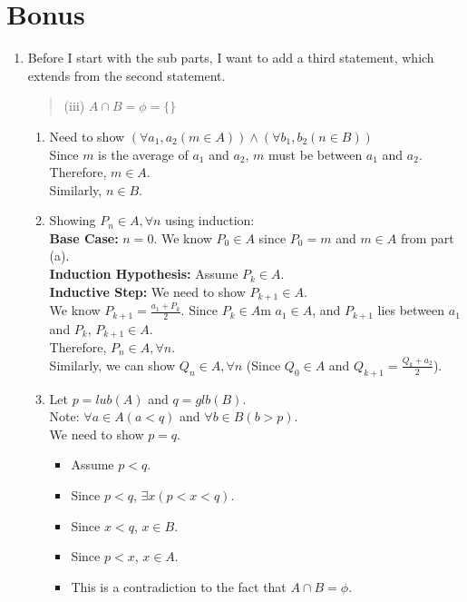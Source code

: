 \documentclass[a4paper]{article}
\begin{document}
\section{Bonus}
    \begin{enumerate}
        \item Before I start with the sub parts, I want to add a third statement, which extends from the second statement.
        \begin{quote}
            (iii) $A \cap B = \phi = \{\}$
        \end{quote}

        \begin{enumerate}
            \item Need to show $(\forall a_1, a_2 (m \in A)) \land (\forall b_1, b_2 (n \in B))$ \\
            Since $m$ is the average of $a_1$ and $a_2$, $m$ must be between $a_1$ and $a_2$. Therefore, $m \in A$. \\
            Similarly, $n \in B$. \\

            \item Showing $P_n \in A, \forall n$ using induction: \\
            \textbf{Base Case:} $n = 0$. We know $P_0 \in A$ since $P_0 = m$ and $m \in A$ from part (a). \\
            \textbf{Induction Hypothesis:} Assume $P_k \in A$. \\
            \textbf{Inductive Step:} We need to show $P_{k+1} \in A$. \\

            We know $P_{k+1} = \frac{a_1 + P_k}{2}$. Since $P_k \in A$m $a_1 \in A$, and $P_{k+1}$ lies between $a_1$ and $P_k$, $P_{k+1} \in A$. \\
            Therefore, $P_n \in A, \forall n$. \\

            Similarly, we can show $Q_n \in A, \forall n$ (Since $Q_0 \in A$ and $Q_{k+1} = \frac{Q_k + a_2}{2}$). \\


            \item Let $p = lub(A)$ and $q = glb(B)$. \\
            Note: $\forall a \in A (a < q)$ and $\forall b \in B (b > p)$. \\
            We need to show $p = q$.
            \begin{itemize}
                \item Assume $p < q$.
                \item Since $p < q$, $\exists x (p < x < q)$.
                \item Since $x < q$, $x \in B$.
                \item Since $p < x$, $x \in A$.
                \item This is a contradiction to the fact that $A \cap B = \phi$. \\
            \end{itemize}


\end{enumerate}
\end{enumerate}
\end{document}
